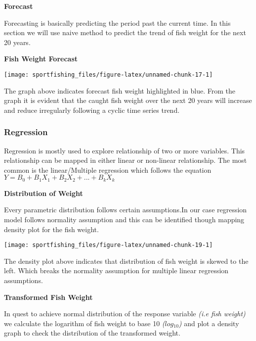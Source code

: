 \documentclass[
]{article}
\begin{document}
\newpage

\textbf{Forecast}

Forecasting is basically predicting the period past the current time. In
this section we will use naive method to predict the trend of fish
weight for the next 20 years.

\textbf{Fish Weight Forecast}

\begin{center}\texttt{[image: sportfishing\_files/figure-latex/unnamed-chunk-17-1]} \end{center}

The graph above indicates forecast fish weight highlighted in blue. From
the graph it is evident that the caught fish weight over the next 20
years will increase and reduce irregularly following a cyclic time
series trend.

\subsubsection{Regression}\label{regression}

Regression is mostly used to explore relationship of two or more
variables. This relationship can be mapped in either linear or
non-linear relationship. The most common is the linear/Multiple
regression which follows the equation
\(Y = B{_0} + B{_1}X{_1} + B{_2}X{_2}+ . . . + B{_k}X{_k}\)

\newpage

\textbf{Distribution of Weight}

Every parametric distribution follows certain assumptions.In our case
regression model follows normality assumption and this can be identified
though mapping density plot for the fish weight.

\begin{center}\texttt{[image: sportfishing\_files/figure-latex/unnamed-chunk-19-1]} \end{center}

The density plot above indicates that distribution of fish weight is
skewed to the left. Which breaks the normality assumption for multiple
linear regression assumptions.

\newpage

\textbf{Transformed Fish Weight}

In quest to achieve normal distribution of the response variable
\emph{(i.e fish weight)} we calculate the logarithm of fish weight to
base 10 \emph{(\(log{_10}\))} and plot a density graph to check the
distribution of the transformed weight.
\end{document}
